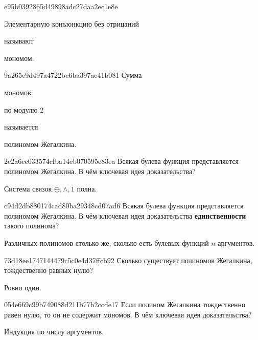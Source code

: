 \begin{note}{e95b0392865d49898adc27daa2ec1e8e}
    \begin{icloze}{2}Элементарную конъюнкцию без отрицаний\end{icloze} называют \begin{icloze}{1}мономом.\end{icloze}
\end{note}

\begin{note}{9a265e9d497a4722bc6ba397ae41b081}
    Сумма \begin{icloze}{2}мономов\end{icloze} \begin{icloze}{3}по модулю \({ 2 }\)\end{icloze} называется \begin{icloze}{1}полиномом Жегалкина.\end{icloze}
\end{note}

\begin{note}{2c2a6cc033574cfba14cb070595e83ea}
    Всякая булева функция представляется полиномом Жегалкина.
    В чём ключевая идея доказательства?

    \begin{cloze}{1}
        Система связок \({ \oplus, \land, 1 }\) полна.
    \end{cloze}
\end{note}

\begin{note}{c94d2db880174cad80ba29348cd07ad6}
    Всякая булева функция представляется полиномом Жегалкина.
    В чём ключевая идея доказательства \textbf{единственности} такого полинома?

    \begin{cloze}{1}
        Различных полиномов столько же, сколько есть булевых функций \({ n }\) аргументов.
    \end{cloze}
\end{note}

\begin{note}{73d18ee1747144479c5c0e4d37ffcb92}
    Сколько существует полиномов Жегалкина, тождественно равных нулю?

    \begin{cloze}{1}
        Ровно один.
    \end{cloze}
\end{note}

\begin{note}{054e669c99b749088d211b77b2ccde17}
    Если полином Жегалкина тождественно равен нулю, то он не содержит мономов.
    В чём ключевая идея доказательства?

    \begin{cloze}{1}
        Индукция по числу аргументов.
    \end{cloze}
\end{note}

